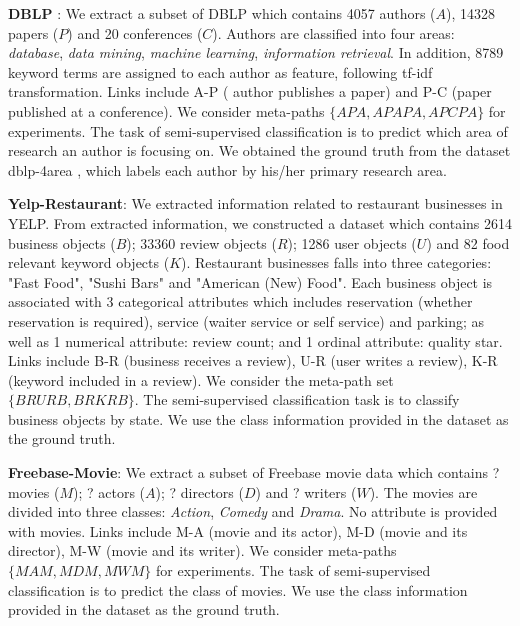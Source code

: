 \noindent{\small$\bullet$}
\textbf{DBLP }: We extract a subset of DBLP which contains 4057 authors ($A$), 14328 papers ($P$) and 20 conferences ($C$). Authors are classified into four areas: \textit{database}, \textit{data mining}, \textit{machine learning}, \textit{information retrieval}. In addition, 8789 keyword terms are assigned to each author as feature, following tf-idf transformation. 
Links include A-P ( author publishes a paper) and P-C (paper published at a conference).
We consider meta-paths $\{APA,APAPA,APCPA\}$ for experiments. The task of semi-supervised classification is to predict which area of research an author is focusing on.
We obtained the ground truth from the dataset dblp-4area \cite{SunYH09}, which
labels each author by his/her primary research area.

\noindent{\small$\bullet$}
\textbf{Yelp-Restaurant}: We extracted information related to restaurant businesses in YELP. From extracted information, we constructed a dataset which contains 2614 business objects ($B$); 33360 review objects ($R$); 1286 user objects ($U$) and 82 food relevant keyword objects ($K$).
Restaurant businesses falls into three categories: "Fast Food", "Sushi Bars" and "American (New) Food".
Each business object is associated with 3 categorical attributes which includes reservation (whether reservation is required), service (waiter service or self service) and parking; as well as 1 numerical attribute: review count; and 1 ordinal attribute: quality star.
Links include B-R (business receives a review), U-R (user writes a review), K-R (keyword included in a review). We consider the meta-path set $\{BRURB, BRKRB\}$. The semi-supervised classification task is to classify business objects by state. We use the class information provided in the dataset as the ground truth.

\noindent{\small$\bullet$}
\textbf{Freebase-Movie}: We extract a subset of Freebase movie data which contains ? movies ($M$); ? actors ($A$); ? directors ($D$) and ? writers ($W$). The movies are divided into three classes: \textit{Action}, \textit{Comedy} and \textit{Drama}. 
No attribute is provided with movies. 
Links include M-A (movie and its actor), M-D (movie and its director), M-W (movie and its writer).
We consider meta-paths $\{MAM,MDM,MWM\}$ for experiments. The task of semi-supervised classification is to predict the class of movies. We use the class information provided in the dataset as the ground truth.

